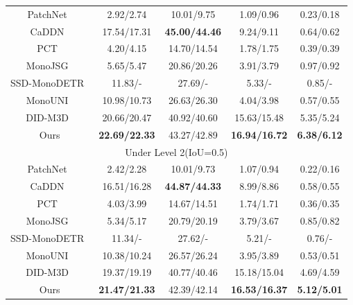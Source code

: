 \documentclass[journal]{IEEEtran}
\begin{document}
\begin{table}[h]
{\begin{tabular}{ccccc}
				PatchNet~\cite{patchnet}              & {2.92/2.74}  	 & {10.01/9.75} 	 & {1.09/0.96} 		 & {0.23/0.18}	\\
				CaDDN~\cite{caddn}                    & {17.54/17.31}    & \textbf{45.00/44.46}     & {9.24/9.11}       & {0.64/0.62}	\\
				PCT~\cite{pct}                     	  & {4.20/4.15}      & {14.70/14.54}     & {1.78/1.75}       & {0.39/0.39}  \\
				MonoJSG~\cite{monojsg}                & {5.65/5.47}      & {20.86/20.26}     & {3.91/3.79}       & {0.97/0.92}  \\
				SSD-MonoDETR~\cite{ssd-monodetr}      & {11.83/-}    	 & {27.69/-}         & {5.33/-}          & {0.85/-}     \\
				MonoUNI~\cite{monouni}                 & {10.98/10.73}    & {26.63/26.30}     & {4.04/3.98}     & {0.57/0.55}  \\
				DID-M3D~\cite{didm3d}                 & {20.66/20.47}    & {40.92/40.60}     & {15.63/15.48}     & {5.35/5.24}  \\
				Ours					 			  &	\textbf{22.69/22.33}	 & {43.27/42.89}	 &	\textbf{16.94/16.72} &	\textbf{6.38/6.12}	 			\\
				\midrule%
				\multicolumn{5}{c}{Under Level 2(IoU=0.5)}                       \\
				\midrule%
				PatchNet~\cite{patchnet}              & {2.42/2.28}      & {10.01/9.73}      & {1.07/0.94}       & {0.22/0.16}  \\
				CaDDN~\cite{caddn}                    & {16.51/16.28}    & \textbf{44.87/44.33}     & {8.99/8.86}       & {0.58/0.55}	\\
				PCT~\cite{pct}                        & {4.03/3.99}      & {14.67/14.51}     & {1.74/1.71}       & {0.36/0.35}  \\
				MonoJSG~\cite{monojsg}                & {5.34/5.17}      & {20.79/20.19}     & {3.79/3.67}       & {0.85/0.82}  \\
				SSD-MonoDETR~\cite{ssd-monodetr}      & {11.34/-}    	 & {27.62/-}     	 & {5.21/-}          & {0.76/-}     \\
				MonoUNI~\cite{monouni}                 & {10.38/10.24}    & {26.57/26.24}     & {3.95/3.89}     & {0.53/0.51}  \\
				DID-M3D~\cite{didm3d}                 & {19.37/19.19}    & {40.77/40.46}     & {15.18/15.04}     & {4.69/4.59}	\\
				Ours & \textbf{21.47/21.33} & {42.39/42.14} & \textbf{16.53/16.37} &\textbf{5.12/5.01}			 								 									\\
				\bottomrule%
			\end{tabular}%
		}
	\end{table}
\end{document}

